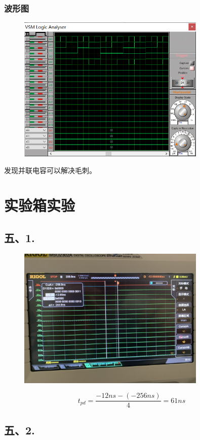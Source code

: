 \documentclass[UTF8, a4paper, 11pt]{article}
\begin{document}
\subsubsection{波形图}
\begin{figure}[H]
    \centering
    \includegraphics[width=0.8\textwidth]{ex2.4波形图.png}
\end{figure}
发现并联电容可以解决毛刺。
\section{实验箱实验}
\subsection{五、1.}
\begin{figure}[H]
    \centering
    \includegraphics[width=0.8\textwidth]{延迟.JPG}
\end{figure}
$$t_{pd}=\frac{-12ns-(-256ns)}{4}=61ns$$
\subsection{五、2.}
\end{document}
